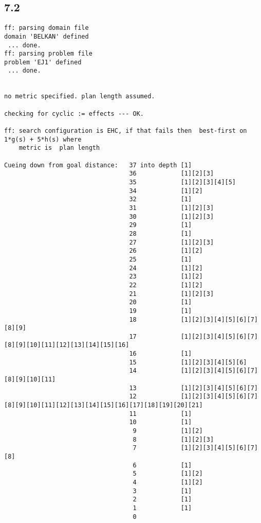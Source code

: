 \documentclass{article}
\begin{document}
\subsection*{7.2}
\begin{lstlisting}
ff: parsing domain file
domain 'BELKAN' defined
 ... done.
ff: parsing problem file
problem 'EJ1' defined
 ... done.


no metric specified. plan length assumed.

checking for cyclic := effects --- OK.

ff: search configuration is EHC, if that fails then  best-first on 1*g(s) + 5*h(s) where
    metric is  plan length

Cueing down from goal distance:   37 into depth [1]
                                  36            [1][2][3]
                                  35            [1][2][3][4][5]
                                  34            [1][2]
                                  32            [1]
                                  31            [1][2][3]
                                  30            [1][2][3]
                                  29            [1]
                                  28            [1]
                                  27            [1][2][3]
                                  26            [1][2]
                                  25            [1]
                                  24            [1][2]
                                  23            [1][2]
                                  22            [1][2]
                                  21            [1][2][3]
                                  20            [1]
                                  19            [1]
                                  18            [1][2][3][4][5][6][7][8][9]
                                  17            [1][2][3][4][5][6][7][8][9][10][11][12][13][14][15][16]
                                  16            [1]
                                  15            [1][2][3][4][5][6]
                                  14            [1][2][3][4][5][6][7][8][9][10][11]
                                  13            [1][2][3][4][5][6][7]
                                  12            [1][2][3][4][5][6][7][8][9][10][11][12][13][14][15][16][17][18][19][20][21]
                                  11            [1]
                                  10            [1]
                                   9            [1][2]
                                   8            [1][2][3]
                                   7            [1][2][3][4][5][6][7][8]
                                   6            [1]
                                   5            [1][2]
                                   4            [1][2]
                                   3            [1]
                                   2            [1]
                                   1            [1]
                                   0


\end{lstlisting}
\end{document}
